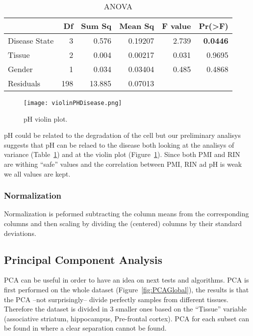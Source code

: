 \documentclass[11pt, onecolumn, twoside]{article}
\begin{document}
\begin{table}[htb!]
    \centering
    \caption{ANOVA}
    \label{tab:ANOVA}
    \begin{adjustbox}{max width=\columnwidth}
\begin{tabular}{ lrrrrr}
    \toprule
                    &Df &Sum Sq &Mean Sq &F value &Pr(>F)\\
    \midrule
    Disease State   &3  &0.576  &0.19207 &2.739   &\textbf{0.0446}\\
    Tissue          &2  & 0.004 &0.00217 &0.031   &0.9695\\
    Gender          &1  &0.034  &0.03404 &0.485   &0.4868\\
    Residuals       &198&13.885 &0.07013 &        &      \\
    \bottomrule
\end{tabular}
    \end{adjustbox}
\end{table}
\begin{figure}[hb!]
    \centering
    \texttt{[image: violinPHDisease.png]}
    \caption{pH violin plot.}
    \label{fig:pH}
\end{figure}

pH could be related to the degradation of the cell but our preliminary analisys suggests that pH can be relaed to the disease both looking at the analisys of variance (Table~\ref{tab:ANOVA}) and at the violin plot (Figure~\ref{fig:pH}).
Since both PMI and RIN are withing ``safe'' values and the correlation between PMI, RIN ad pH is weak we all values are kept.

\subsubsection{Normalization}

Normalization is peformed subtracting the column means from the corresponding columns and then scaling by dividing the (centered) columns by their standard deviations.

\subsection{Principal Component Analysis}

PCA can be useful in order to have an idea on next tests and algorithms.
PCA is first performed on the whole dataset (Figure~\ref{fig:PCAGlobal}), the results is that the PCA --not surprisingly-- divide perfectly samples from different tissues.
Therefore the dataset is divided in 3 smaller ones based on the ``Tissue'' variable (associative striatum, hippocampus, Pre-frontal cortex).
PCA for each subset can be found in  where a clear separation cannot be found.
\end{document}
